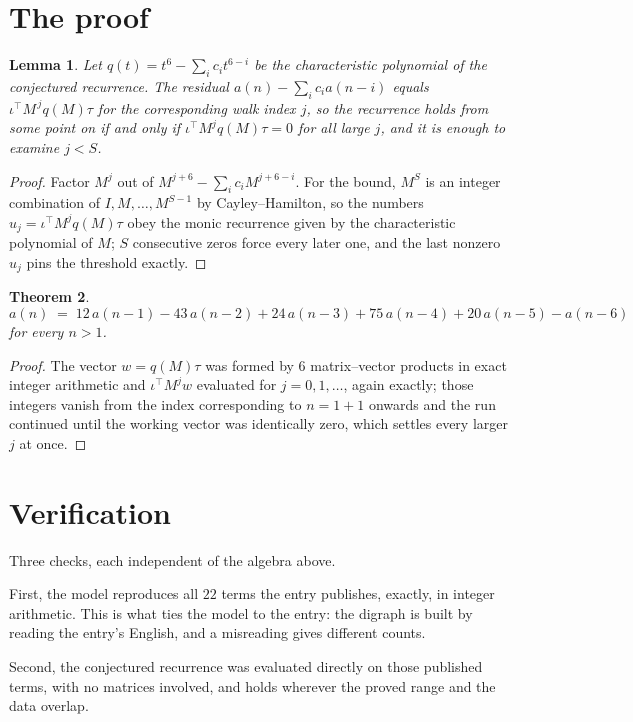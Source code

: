 \documentclass[11pt,a4paper]{article}
\theoremstyle{plain}
\newtheorem{theorem}{Theorem}
\newtheorem{lemma}[theorem]{Lemma}
\theoremstyle{definition}
\begin{document}
\section{The proof}

\begin{lemma}\label{lem:crit}
Let $q(t)=t^{6}-\sum_i c_it^{6-i}$ be the characteristic polynomial of the
conjectured recurrence. The residual $a(n)-\sum_ic_ia(n-i)$ equals
$\iota^{\!\top}M^{\,j}q(M)\tau$ for the corresponding walk index $j$, so the recurrence
holds from some point on if and only if $\iota^{\!\top}M^{j}q(M)\tau=0$ for all large $j$,
and it is enough to examine $j<S$.
\end{lemma}

\begin{proof}
Factor $M^{j}$ out of $M^{j+6}-\sum_ic_iM^{j+6-i}$. For the bound, $M^{S}$
is an integer combination of $I,M,\dots,M^{S-1}$ by Cayley--Hamilton, so the numbers
$u_j=\iota^{\!\top}M^{j}q(M)\tau$ obey the monic recurrence given by the characteristic
polynomial of $M$; $S$ consecutive zeros force every later one, and the last nonzero $u_j$
pins the threshold exactly.
\end{proof}

\begin{theorem}
\[
a(n)\;=\;12\,a(n-1) - 43\,a(n-2) + 24\,a(n-3) + 75\,a(n-4) + 20\,a(n-5) - a(n-6)
\]
for every $n>1$.
\end{theorem}

\begin{proof}
The vector $w=q(M)\tau$ was formed by $6$ matrix--vector products in exact integer
arithmetic and $\iota^{\!\top}M^{j}w$ evaluated for $j=0,1,\dots$, again exactly; those
integers vanish from the index corresponding to $n=1+1$ onwards and the run continued
until the working vector was identically zero, which settles every larger $j$ at once.
\end{proof}

\section{Verification}

Three checks, each independent of the algebra above.

First, the model reproduces all $22$ terms the entry publishes, exactly, in integer
arithmetic. This is what ties the model to the entry: the digraph is built by reading the
entry's English, and a misreading gives different counts.

Second, the conjectured recurrence was evaluated directly on those published terms, with no
matrices involved, and holds wherever the proved range and the data overlap.
\end{document}
